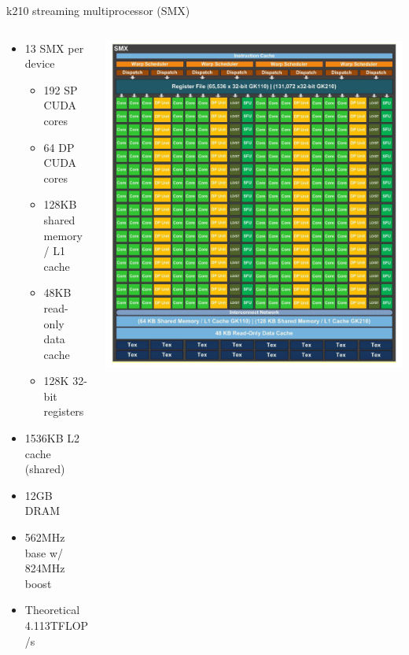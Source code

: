 \documentclass[10pt,t]{beamer}
\begin{document}
  \begin{frame}{k210 streaming multiprocessor (SMX)}
    \hspace{-25ex}
    \begin{columns}[T]
      \begin{column}{.56\textwidth}
        \begin{itemize}
          \item 13 SMX per device
            \begin{itemize}
              \item 192 SP CUDA cores
              \item 64 DP CUDA cores
              \item 128KB shared memory / L1 cache
              \item 48KB read-only data cache
              \item 128K 32-bit registers
            \end{itemize}
          \item 1536KB L2 cache (shared)
          \item 12GB DRAM
          \item 562MHz base w/ 824MHz boost
          \item<2> Theoretical 4.113TFLOP/s
        \end{itemize}
      \end{column}
      \begin{column}{.51575\textwidth}
        \includegraphics[width=\textwidth]{k210-smx.png}
      \end{column}
    \end{columns}


\end{frame}
\end{document}
